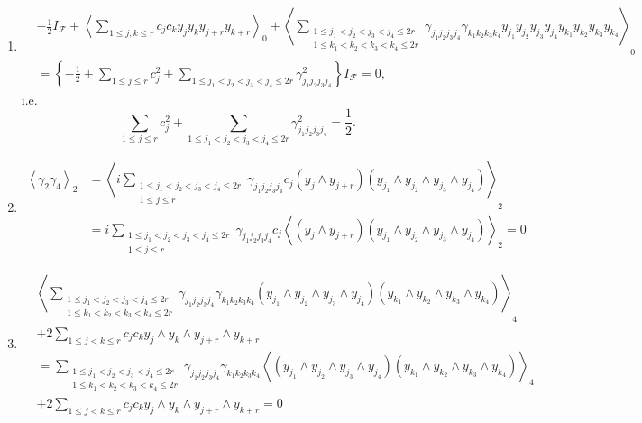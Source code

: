\documentclass[aps,preprint]{revtex4}%
\begin{document}
\begin{enumerate}
\item
\begin{align}
&  -\frac{1}{2}I_{\mathcal{F}}+\left\langle \sum_{1\leq j,k\leq r}c_{j}%
c_{k}y_{j}y_{k}y_{j+r}y_{k+r}\right\rangle _{0}+\left\langle \sum
_{\substack{1\leq j_{1}<j_{2}<j_{3}<j_{4}\leq2r\\1\leq k_{1}<k_{2}<k_{3}%
<k_{4}\leq2r}}\gamma_{j_{1}j_{2}j_{3}j_{4}}\gamma_{k_{1}k_{2}k_{3}k_{4}%
}y_{j_{1}}y_{j_{2}}y_{j_{3}}y_{j_{4}}y_{k_{1}}y_{k_{2}}y_{k_{3}}y_{k_{4}%
}\right\rangle _{0}\\
&  =\left\{  -\frac{1}{2}+\sum_{1\leq j\leq r}c_{j}^{2}+\sum_{1\leq
j_{1}<j_{2}<j_{3}<j_{4}\leq2r}\gamma_{j_{1}j_{2}j_{3}j_{4}}^{2}\right\}
I_{\mathcal{F}}=0,
\end{align}
i.e.
\begin{equation}
\sum_{1\leq j\leq r}c_{j}^{2}+\sum_{1\leq j_{1}<j_{2}<j_{3}<j_{4}\leq2r}%
\gamma_{j_{1}j_{2}j_{3}j_{4}}^{2}=\frac{1}{2}.
\end{equation}


\item
\begin{align}
\left\langle \gamma_{2}\gamma_{4}\right\rangle _{2}  &  =\left\langle
i\sum_{\substack{1\leq j_{1}<j_{2}<j_{3}<j_{4}\leq2r\\1\leq j\leq r}%
}\gamma_{j_{1}j_{2}j_{3}j_{4}}c_{j}\left(  y_{j}\wedge y_{j+r}\right)  \left(
y_{j_{1}}\wedge y_{j_{2}}\wedge y_{j_{3}}\wedge y_{j_{4}}\right)
\right\rangle _{2}\\
&  =i\sum_{\substack{1\leq j_{1}<j_{2}<j_{3}<j_{4}\leq2r\\1\leq j\leq
r}}\gamma_{j_{1}j_{2}j_{3}j_{4}}c_{j}\left\langle \overset{}{\left(
y_{j}\wedge y_{j+r}\right)  \left(  y_{j_{1}}\wedge y_{j_{2}}\wedge y_{j_{3}%
}\wedge y_{j_{4}}\right)  }\right\rangle _{2}=0
\end{align}


\item
\begin{align}
&  \left\langle \sum_{\substack{1\leq j_{1}<j_{2}<j_{3}<j_{4}\leq2r\\1\leq
k_{1}<k_{2}<k_{3}<k_{4}\leq2r}}\gamma_{j_{1}j_{2}j_{3}j_{4}}\gamma_{k_{1}%
k_{2}k_{3}k_{4}}\left(  y_{j_{1}}\wedge y_{j_{2}}\wedge y_{j_{3}}\wedge
y_{j_{4}}\right)  \left(  y_{k_{1}}\wedge y_{k_{2}}\wedge y_{k_{3}}\wedge
y_{k_{4}}\right)  \right\rangle _{4}\\
&  +2\sum_{1\leq j<k\leq r}c_{j}c_{k}y_{j}\wedge y_{k}\wedge y_{j+r}\wedge
y_{k+r}\\
&  =\sum_{\substack{1\leq j_{1}<j_{2}<j_{3}<j_{4}\leq2r\\1\leq k_{1}%
<k_{2}<k_{3}<k_{4}\leq2r}}\gamma_{j_{1}j_{2}j_{3}j_{4}}\gamma_{k_{1}k_{2}%
k_{3}k_{4}}\left\langle \overset{}{\left(  y_{j_{1}}\wedge y_{j_{2}}\wedge
y_{j_{3}}\wedge y_{j_{4}}\right)  \left(  y_{k_{1}}\wedge y_{k_{2}}\wedge
y_{k_{3}}\wedge y_{k_{4}}\right)  }\right\rangle _{4}\\
&  +2\sum_{1\leq j<k\leq r}c_{j}c_{k}y_{j}\wedge y_{k}\wedge y_{j+r}\wedge
y_{k+r}=0
\end{align}



\end{enumerate}
\end{document}

